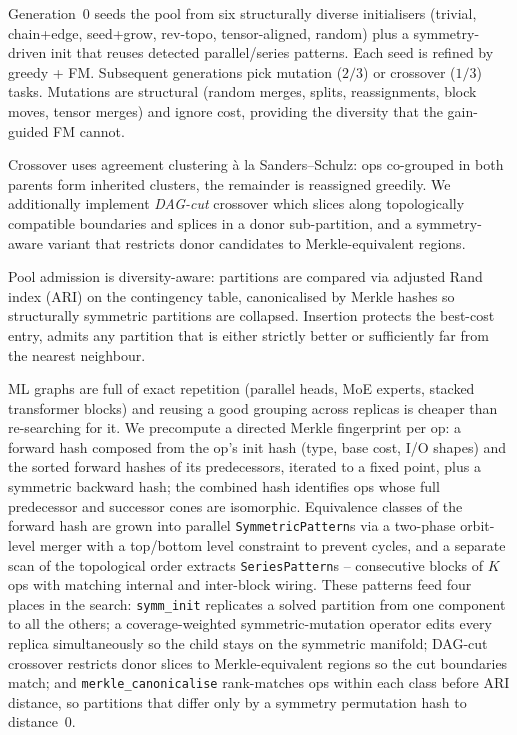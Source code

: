\documentclass[10pt,a4paper]{article}
\makeatletter
\renewcommand\section{\@startsection{section}{1}{\z@}{6pt}{2pt}{\normalsize\bfseries}}
\makeatother
\begin{document}
Generation~0 seeds the pool from six structurally diverse initialisers
(trivial, chain+edge, seed+grow, rev-topo, tensor-aligned, random) plus a
symmetry-driven init that reuses detected parallel/series patterns. Each
seed is refined by greedy + FM. Subsequent generations pick mutation
($2/3$) or crossover ($1/3$) tasks. Mutations are structural (random
merges, splits, reassignments, block moves, tensor merges) and ignore
cost, providing the diversity that the gain-guided FM cannot.

Crossover uses agreement clustering \`a la Sanders--Schulz: ops co-grouped
in both parents form inherited clusters, the remainder is reassigned
greedily. We additionally implement \emph{DAG-cut} crossover which slices
along topologically compatible boundaries and splices in a donor
sub-partition, and a symmetry-aware variant that restricts donor
candidates to Merkle-equivalent regions.

Pool admission is diversity-aware: partitions are compared via adjusted
Rand index (ARI) on the contingency table, canonicalised by Merkle
hashes so structurally symmetric partitions are collapsed. Insertion
protects the best-cost entry, admits any partition that is either
strictly better or sufficiently far from the nearest neighbour.

\section{Symmetry detection}

ML graphs are full of exact repetition (parallel heads, MoE experts,
stacked transformer blocks) and reusing a good grouping across replicas
is cheaper than re-searching for it. We precompute a directed Merkle
fingerprint per op: a forward hash composed from the op's init hash
(type, base cost, I/O shapes) and the sorted forward hashes of its
predecessors, iterated to a fixed point, plus a symmetric backward
hash; the combined hash identifies ops whose full predecessor and
successor cones are isomorphic. Equivalence classes of the forward
hash are grown into parallel \texttt{SymmetricPattern}s via a two-phase
orbit-level merger with a top/bottom level constraint to prevent
cycles, and a separate scan of the topological order extracts
\texttt{SeriesPattern}s -- consecutive blocks of $K$ ops with matching
internal and inter-block wiring. These patterns feed four places in
the search: \texttt{symm\_init} replicates a solved partition from one
component to all the others; a coverage-weighted symmetric-mutation
operator edits every replica simultaneously so the child stays on the
symmetric manifold; DAG-cut crossover restricts donor slices to
Merkle-equivalent regions so the cut boundaries match; and
\texttt{merkle\_canonicalise} rank-matches ops within each class
before ARI distance, so partitions that differ only by a symmetry
permutation hash to distance~0.
\end{document}

